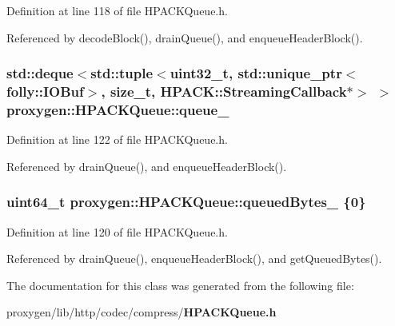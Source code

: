 Definition at line 118 of file H\+P\+A\+C\+K\+Queue.\+h.



Referenced by decode\+Block(), drain\+Queue(), and enqueue\+Header\+Block().

\subsubsection[{queue\+\_\+}]{\setlength{\rightskip}{0pt plus 5cm}std\+::deque$<$std\+::tuple$<$uint32\+\_\+t, std\+::unique\+\_\+ptr$<$folly\+::\+I\+O\+Buf$>$, size\+\_\+t, {\bf H\+P\+A\+C\+K\+::\+Streaming\+Callback}$\ast$$>$ $>$ proxygen\+::\+H\+P\+A\+C\+K\+Queue\+::queue\+\_\+\hspace{0.3cm}{\ttfamily [private]}}\label{classproxygen_1_1HPACKQueue_a0485192d4d5e484bbcb9043ed6a35dc7}


Definition at line 122 of file H\+P\+A\+C\+K\+Queue.\+h.



Referenced by drain\+Queue(), and enqueue\+Header\+Block().

\subsubsection[{queued\+Bytes\+\_\+}]{\setlength{\rightskip}{0pt plus 5cm}uint64\+\_\+t proxygen\+::\+H\+P\+A\+C\+K\+Queue\+::queued\+Bytes\+\_\+ \{0\}\hspace{0.3cm}{\ttfamily [private]}}\label{classproxygen_1_1HPACKQueue_aea91338bb2954aa5bfc5f340e51169fc}


Definition at line 120 of file H\+P\+A\+C\+K\+Queue.\+h.



Referenced by drain\+Queue(), enqueue\+Header\+Block(), and get\+Queued\+Bytes().



The documentation for this class was generated from the following file\+:\begin{DoxyCompactItemize}
\item 
proxygen/lib/http/codec/compress/{\bf H\+P\+A\+C\+K\+Queue.\+h}\end{DoxyCompactItemize}
